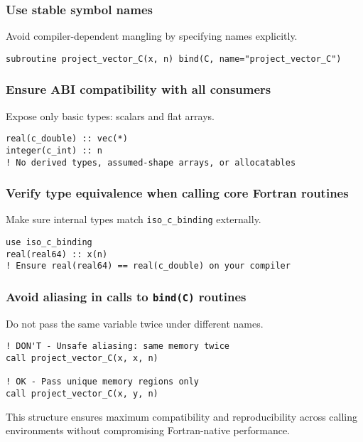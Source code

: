 \documentclass{article}
\begin{document}
\subsubsection{Use stable symbol names}

Avoid compiler-dependent mangling by specifying names explicitly.

\begin{verbatim}
subroutine project_vector_C(x, n) bind(C, name="project_vector_C")
\end{verbatim}

\subsubsection{Ensure ABI compatibility with all consumers}

Expose only basic types: scalars and flat arrays.

\begin{verbatim}
real(c_double) :: vec(*)
integer(c_int) :: n
! No derived types, assumed-shape arrays, or allocatables
\end{verbatim}

\subsubsection{Verify type equivalence when calling core Fortran routines}

Make sure internal types match \texttt{iso\_c\_binding} externally.

\begin{verbatim}
use iso_c_binding
real(real64) :: x(n)
! Ensure real(real64) == real(c_double) on your compiler
\end{verbatim}

\subsubsection{Avoid aliasing in calls to \texttt{bind(C)} routines}

Do not pass the same variable twice under different names.

\begin{verbatim}
! DON'T - Unsafe aliasing: same memory twice
call project_vector_C(x, x, n)

! OK - Pass unique memory regions only
call project_vector_C(x, y, n)
\end{verbatim}

This structure ensures maximum compatibility and reproducibility across calling environments without compromising Fortran-native performance.
\end{document}
